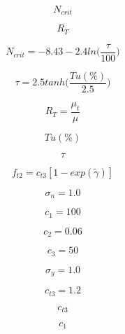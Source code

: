 \begin{equation}
N_{crit}
\end{equation}

\begin{equation}
R_T
\end{equation}

\begin{equation}
N_{crit} = -8.43 - 2.4 {ln} \Big( {\frac{\tau}{100}} \Big)
\end{equation}

\begin{equation}
\tau =2.5 {tanh}\bigg(\frac{Tu(\%)}{2.5}\bigg)
\end{equation}

\begin{equation}
R_T = \frac{\mu_t}{\mu}
\end{equation}

\begin{equation}
Tu(\%)
\end{equation}

\begin{equation}
\tau
\end{equation}

\begin{equation}
f_{t2} = c_{t3}[1 - {exp}(\tilde{\gamma})]
\end{equation}

\begin{equation}
\sigma_n = 1.0
\end{equation}

\begin{equation}
c_1 = 100
\end{equation}

\begin{equation}
c_2 = 0.06
\end{equation}

\begin{equation}
c_3 = 50
\end{equation}

\begin{equation}
\sigma_y = 1.0
\end{equation}

\begin{equation}
c_{t3} = 1.2
\end{equation}

\begin{equation}
c_{t3}
\end{equation}

\begin{equation}
c_1
\end{equation}

